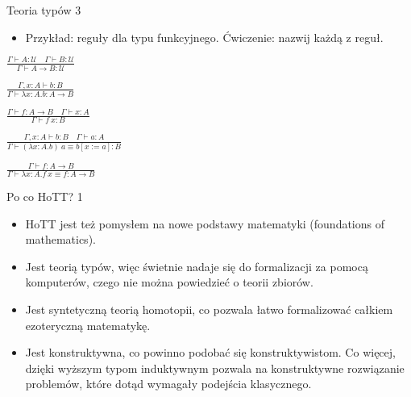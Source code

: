 \documentclass{beamer}
\newcommand{\U}{\mathcal{U}}
\begin{document}
\begin{frame}{Teoria typów 3}
\begin{itemize}
	\item Przykład: reguły dla typu funkcyjnego. Ćwiczenie: nazwij każdą z reguł.
\end{itemize}

	\begin{center}
		$\displaystyle \frac{\Gamma \vdash A : \U \quad \Gamma \vdash B : \U}{\Gamma \vdash A \to B : \U}$
	\end{center}
	\begin{center}
		$\displaystyle \frac{\Gamma, x : A \vdash b : B}{\Gamma \vdash \lambda x:A.b : A \to B}$
	\end{center}
	\begin{center}
		$\displaystyle \frac{\Gamma \vdash f : A \to B \quad \Gamma \vdash x : A}{\Gamma \vdash f\ x : B}$
	\end{center}
	\begin{center}
		$\displaystyle \frac{\Gamma, x : A \vdash b : B \quad \Gamma \vdash a : A}{\Gamma \vdash (\lambda x:A.b)\ a \equiv b[x := a] : B}$
	\end{center}
	\begin{center}
		$\displaystyle \frac{\Gamma \vdash f : A \to B}{\Gamma \vdash \lambda x:A.f\ x \equiv f : A \to B}$
	\end{center}
	
\end{frame}

\begin{frame}{Po co HoTT? 1}
\begin{itemize}
	\item HoTT jest też pomysłem na nowe podstawy matematyki (foundations of mathematics).
	\item Jest teorią typów, więc świetnie nadaje się do formalizacji za pomocą komputerów, czego nie można powiedzieć o teorii zbiorów.
	\item Jest syntetyczną teorią homotopii, co pozwala łatwo formalizować całkiem ezoteryczną matematykę.
	\item Jest konstruktywna, co powinno podobać się konstruktywistom. Co więcej, dzięki wyższym typom induktywnym pozwala na konstruktywne rozwiązanie problemów, które dotąd wymagały podejścia klasycznego.
\end{itemize}
\end{frame}
\end{document}
